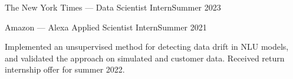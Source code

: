   {The New York Times --- Data Scientist Intern}{Summer 2023}

\vspace{0.15em}



\vspace{0.15em}

  {Amazon --- Alexa Applied Scientist Intern}{Summer 2021}

\vspace{0.15em}

Implemented an unsupervised method for detecting data drift in NLU models, and
validated the approach on simulated and customer data. Received return internship offer for summer 2022.
